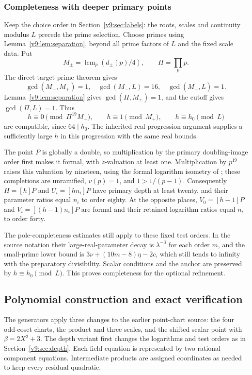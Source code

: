 \subsubsection{Completeness with deeper primary points}\label{subsec:v9-deep-completeness}
Keep the choice order in Section~\ref{v9:sec:labels}: the roots, scales and continuity modulus $L$ precede the prime selection. Choose primes using Lemma~\ref{v9:lem:separation}, beyond all prime factors of $L$ and the fixed scale data. Put
\[
 M_\pm=\mathop{\mathrm{lcm}}_p(d_\pm(p)/4),\qquad \Pi=\prod_p p.
\]
The direct-target prime theorem gives
\[
 \gcd(M_-,M_+)=1,\quad
 \gcd(M_-,L)=16,\quad\gcd(M_+,L)=1.
\]
Lemma~\ref{v9:lem:separation} gives $\gcd(\Pi,M_+)=1$, and the cutoff gives $\gcd(\Pi,L)=1$. Thus
\[
 h\equiv0\pmod{\Pi^{19}M_-},\qquad
 h\equiv1\pmod{M_+},\qquad h\equiv h_0\pmod L
\]
are compatible, since $64\mid h_0$. The inherited real-progression argument supplies a sufficiently large $h$ in this progression with the same real bounds.

The point $P$ is globally a double, so multiplication by the primary doubling-image order first makes it formal, with $z$-valuation at least one. Multiplication by $p^{19}$ raises this valuation by nineteen, using the formal logarithm isometry of \cite[Theorem IV.6.4, p. 132]{silverman}; these completions are unramified, $v(p)=1$, and $1>1/(p-1)$. Consequently $H=[h]P$ and $U_i=[hn_i]P$ have primary depth at least twenty, and their parameter ratios equal $n_i$ to order eighty. At the opposite places, $V_0=[h-1]P$ and $V_i=[(h-1)n_i]P$ are formal and their retained logarithm ratios equal $n_i$ to order forty.

The pole-completeness estimates still apply to these fixed test orders. In the source notation their large-real-parameter decay is $\lambda^{-3}$ for each order $m$, and the small-prime lower bound is $3\nu+(10m-8)\eta-2c$, which still tends to infinity with the preparatory divisibility. Scalar conditions and the anchor are preserved by $h\equiv h_0\pmod L$. This proves completeness for the optional refinement.

\subsection{Polynomial construction and exact verification}\label{subsec:v9-finite}
The generators apply three changes to the earlier point-chart source: the four odd-coset charts, the product and three scales, and the shifted scalar point with $\beta=2X^2+3$. The depth variant first changes the logarithms and test orders as in Section~\ref{v9:sec:depth}. Each field equation is represented by two rational component equations. Intermediate products are assigned coordinates as needed to keep every residual quadratic.

